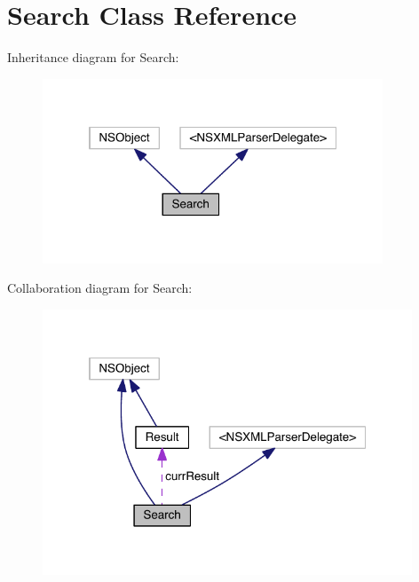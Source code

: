 \section{Search Class Reference}
\label{interface_search}


Inheritance diagram for Search\+:
\nopagebreak
\begin{figure}[H]
\begin{center}
\leavevmode
\includegraphics[width=287pt]{interface_search__inherit__graph}
\end{center}
\end{figure}


Collaboration diagram for Search\+:
\nopagebreak
\begin{figure}[H]
\begin{center}
\leavevmode
\includegraphics[width=312pt]{interface_search__coll__graph}
\end{center}
\end{figure}
